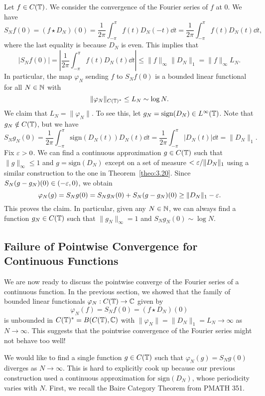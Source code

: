 Let $f \in C(\mathbb{T})$. We consider the convergence of the Fourier series of $f$ at $0$. 
We have 
\[ S_N f(0) = (f \star D_N)(0) = \frac{1}{2\pi} \int_{-\pi}^\pi f(t) D_N(-t)\dd t 
= \frac{1}{2\pi} \int_{-\pi}^\pi f(t) D_N(t)\dd t, \] 
where the last equality is because $D_N$ is even. This implies that 
\[ |S_N f(0)| = \left| \frac{1}{2\pi} \int_{-\pi}^\pi f(t) D_N(t)\dd t \right| 
\leq \|f\|_\infty \|D_N\|_1 = \|f\|_\infty L_N. \] 
In particular, the map $\varphi_N$ sending $f$ to $S_N f(0)$ is a bounded 
linear functional for all $N \in \mathbb{N}$ with 
\[ \|\varphi_N\|_{C(\mathbb{T})^*} \leq L_N \sim \log N. \] 
We claim that $L_N = \|\varphi_N\|$. To see this, let $g_N = \text{sign}(D_N) \in L^\infty(\mathbb{T})$. 
Note that $g_N \notin C(\mathbb{T})$, but we have 
\[ S_N g_N(0) = \frac{1}{2\pi} \int_{-\pi}^\pi \text{sign}(D_N(t))D_N(t) \dd t
= \frac{1}{2\pi} \int_{-\pi}^\pi |D_N(t)|\dd t = \|D_N\|_1. \] 
Fix $\varepsilon > 0$. We can find a continuous approximation $g \in C(\mathbb{T})$ such that 
$\|g\|_\infty \leq 1$ and $g = \text{sign}(D_N)$ except on a set of measure 
$< \varepsilon/\|D_N\|_1$ using a similar construction to the one in Theorem~\ref{theo:3.20}.
Since $S_N(g - g_N)(0) \in (-\varepsilon, 0)$, we obtain 
\[ \varphi_N(g) = S_N g(0) = S_N g_N(0) + S_N (g - g_N)(0) 
\geq \|D_N\|_1 - \varepsilon. \] 
This proves the claim. In particular, given any $N \in \mathbb{N}$, we can always find a 
function $g_N \in C(\mathbb{T})$ such that $\|g_N\|_\infty = 1$ and $S_N g_N(0) \sim \log N$.

\subsection{Failure of Pointwise Convergence for Continuous Functions} \label{subsec:5.4}
We are now ready to discuss the pointwise converge of the Fourier series of a 
continuous function. In the previous section, we showed that 
the family of bounded linear functionals $\varphi_N : C(\mathbb{T}) \to \mathbb{C}$ given by 
\[ \varphi_N(f) = S_N f(0) = (f \star D_N)(0) \] 
is unbounded in $C(\mathbb{T})^* = B(C(\mathbb{T}), \mathbb{C})$ with 
$\|\varphi_N\| = \|D_N\|_1 = L_N \to \infty$ as $N \to \infty$. This 
suggests that the pointwise convergence of the Fourier series might not 
behave too well! 

We would like to find a single function $g \in C(\mathbb{T})$ such that 
$\varphi_N(g) = S_N g(0)$ diverges as $N \to \infty$. This is hard to explicitly
cook up because our previous construction used a continuous approximation for 
$\text{sign}(D_N)$, whose periodicity varies with $N$. 
First, we recall the Baire Category Theorem from PMATH 351. 

